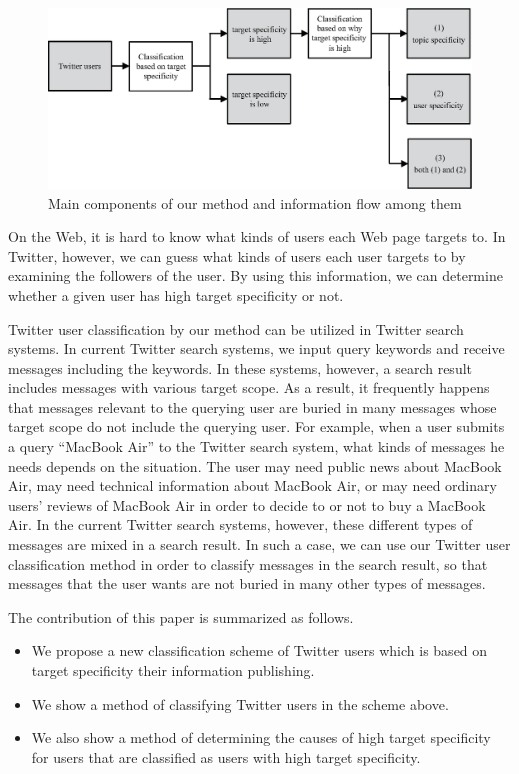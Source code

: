 \begin{figure}[t]
\begin{center}
\includegraphics[width=14cm]{images/flow.eps}
 \caption{Main components of our method and information flow among them}
\label{fig:Flow}
\end{center}
\end{figure}

On the Web, it is hard to know what kinds of users each Web page
targets to.  In Twitter, however, we can guess what kinds of users
each user targets to by examining the followers of the user.  By using
this information, we can determine whether a given user has high
target specificity or not.

Twitter user classification by our method can be utilized in Twitter
search systems.  In current Twitter search systems, we input query
keywords and receive messages including the keywords.  In these
systems, however, a search result includes messages with various
target scope.  As a result, it frequently happens that messages
relevant to the querying user are buried in many messages whose target
scope do not include the querying user.  For example, when a user
submits a query ``MacBook Air'' to the Twitter search system, what
kinds of messages he needs depends on the situation.  The user may
need public news about MacBook Air, may need technical information
about MacBook Air, or may need ordinary users' reviews of MacBook Air
in order to decide to or not to buy a MacBook Air.  In the current
Twitter search systems, however, these different types of messages are
mixed in a search result.  In such a case, we can use our Twitter user
classification method in order to classify messages in the search
result, so that messages that the user wants are not buried in many
other types of messages.

The contribution of this paper is summarized as follows.

\begin{itemize}
\item We propose a new classification scheme of Twitter users which is
based on target specificity their information publishing.
\item We show a method of classifying Twitter users in the scheme above.
\item We also show a method of determining the causes of high target
specificity for users that are classified as users with high target specificity.
\end{itemize}

